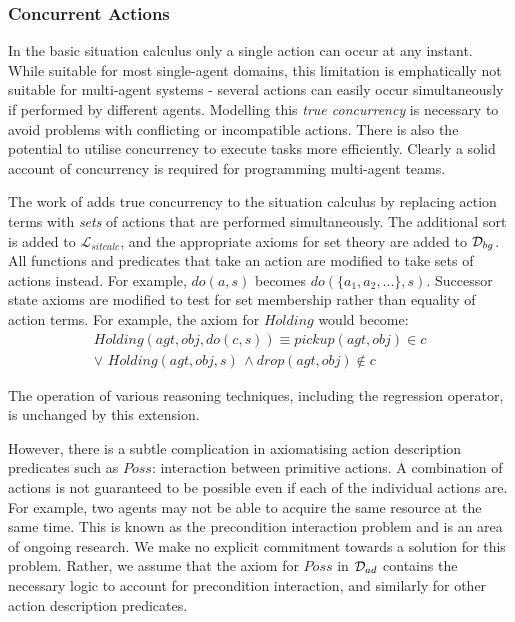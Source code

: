 \subsubsection{Concurrent Actions}

In the basic situation calculus only a single action can occur at
any instant. While suitable for most single-agent domains, this limitation
is emphatically not suitable for multi-agent systems - several actions
can easily occur simultaneously if performed by different agents.
Modelling this \emph{true concurrency} is necessary to avoid problems
with conflicting or incompatible actions. There is also the potential
to utilise concurrency to execute tasks more efficiently. Clearly
a solid account of concurrency is required for programming multi-agent
teams.

The work of \citep{lin92sc_conc,reiter96sc_nat_conc} adds true concurrency
to the situation calculus by replacing action terms with \emph{sets}
of actions that are performed simultaneously. The additional sort
 is added to $\mathcal{L}_{sitcalc}$, and the appropriate
axioms for set theory are added to $\mathcal{D}_{bg}$. All functions and
predicates that take an action are modified to take sets of actions
instead. For example, $do(a,s)$ becomes $do(\{a_{1},a_{2},...\},s)$.
Successor state axioms are modified to test for set membership rather
than equality of action terms. For example, the axiom for $Holding$
would become:\begin{multline*}
Holding(agt,obj,do(c,s))\equiv pickup(agt,obj)\in c\\
\vee\,\, Holding(agt,obj,s)\,\wedge drop(agt,obj)\not\in c\end{multline*}


The operation of various reasoning techniques, including the regression
operator, is unchanged by this extension.

However, there is a subtle complication in axiomatising action description
predicates such as $Poss$: interaction between primitive actions.
A combination of actions is not guaranteed to be possible even if
each of the individual actions are. For example, two agents may not
be able to acquire the same resource at the same time. This is known
as the precondition interaction problem \citep{pinto94temporal} and
is an area of ongoing research. We make no explicit commitment towards
a solution for this problem. Rather, we assume that the axiom for
$Poss$ in $\mathcal{D}_{ad}$ contains the necessary logic to account for
precondition interaction, and similarly for other action description
predicates.

